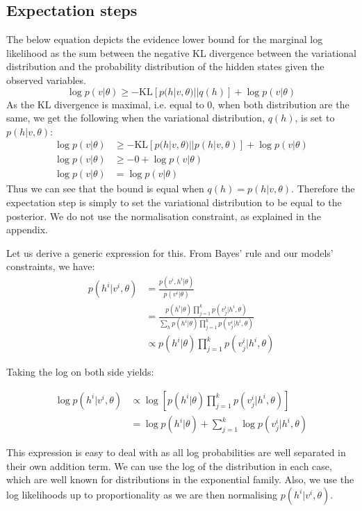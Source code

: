 \documentclass[]{article}
\begin{document}
\subsection{Expectation steps}

The below equation depicts the evidence lower bound for the marginal log likelihood as the sum between the negative KL divergence between the variational distribution and the probability distribution of the hidden states given the observed variables.
\[
	\log p(v|\theta) \geq - \text{KL}[p(h|v,\theta)||q(h)] + \log p(v|\theta)
\]
As the KL divergence is maximal, i.e. equal to 0, when both distribution are the same, we get the following when the variational distribution, $q(h)$, is set to $p(h|v,\theta)$:
\begin{align*}
	\log p(v|\theta) &\geq - \text{KL}[p(h|v,\theta)||p(h|v,\theta)] + \log p(v|\theta) \\
	\log p(v|\theta) &\geq - 0 + \log p(v|\theta) \\
	\log p(v|\theta) &= \log p(v|\theta)	
\end{align*}
Thus we can see that the bound is equal when $q(h) = p(h|v,\theta)$. Therefore the expectation step is simply to set the variational distribution to be equal to the posterior. We do not use the normalisation constraint, as explained in the appendix.

Let us derive a generic expression for this. From Bayes' rule and our models' constraints, we have:
\begin{align*}
	p(h^i|v^i,\theta) &= \frac{p(v^i,h^i|\theta)}{p(v^i|\theta)} \\
	&= \frac{p(h^i|\theta) \prod_{j=1}^{k} p(v_j^i|h^i, \theta)}{\sum_{h}p(h^i|\theta) \prod_{j=1}^{k} p(v_j^i|h^i, \theta)} \\
	&\propto p(h^i|\theta) \prod_{j=1}^{k} p(v_j^i|h^i, \theta)
\end{align*}

Taking the log on both side yields:

\begin{align*}
	\log p(h^i|v^i,\theta) &\propto \log \left[ p(h^i|\theta) \prod_{j=1}^{k} p(v_j^i|h^i, \theta) \right] \\
	&= \log p(h^i|\theta) + \sum_{j=1}^{k} \log p(v_j^i|h^i, \theta)  
\end{align*}

This expression is easy to deal with as all log probabilities are well separated in their own addition term. We can use the log of the distribution in each case, which are well known for distributions in the exponential family. Also, we use the log likelihoods up to proportionality as we are then normalising $p(h^i|v^i, \theta)$.
\end{document}
